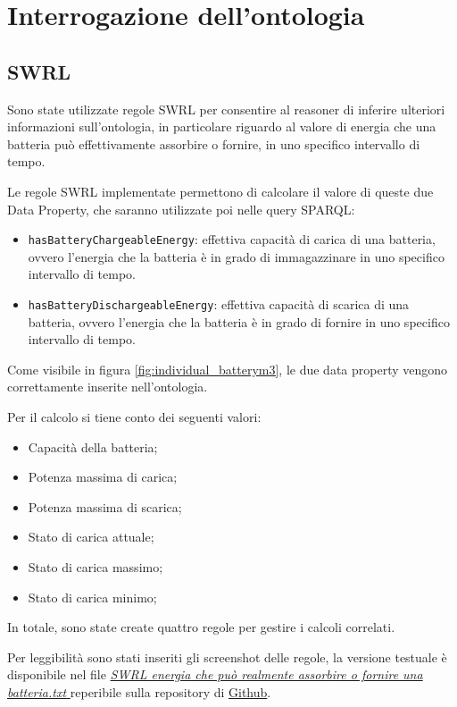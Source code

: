 \chapter{Interrogazione dell'ontologia}

\section{SWRL}
Sono state utilizzate regole SWRL per consentire al reasoner di inferire ulteriori informazioni sull'ontologia, in particolare riguardo al valore di energia che una batteria può effettivamente assorbire o fornire, in uno specifico intervallo di tempo.

Le regole SWRL implementate permettono di calcolare il valore di queste due Data Property, che saranno utilizzate poi nelle query SPARQL:
\begin{itemize}
    \item \texttt{hasBatteryChargeableEnergy}: effettiva capacità di carica di una batteria, ovvero l'energia che la batteria è in grado di immagazzinare in uno specifico intervallo di tempo.
    \item \texttt{hasBatteryDischargeableEnergy}: effettiva capacità di scarica di una batteria, ovvero l'energia che la batteria è in grado di fornire in uno specifico intervallo di tempo.
\end{itemize}

Come visibile in figura \ref{fig:individual_batterym3}, le due data property vengono correttamente inserite nell'ontologia.

Per il calcolo si tiene conto dei seguenti valori:
\begin{itemize}
    \item Capacità della batteria;
    \item Potenza massima di carica;
    \item Potenza massima di scarica;
    \item Stato di carica attuale;
    \item Stato di carica massimo;
    \item Stato di carica minimo;
\end{itemize}


In totale, sono state create quattro regole per gestire i calcoli correlati.


Per leggibilità sono stati inseriti gli screenshot delle regole, la versione testuale è disponibile nel file \href{https://github.com/19eddie/SemanticWeb-Assignment02-03/blob/main/SWRL%20energia%20che%20pu%C3%B2%20realmente%20assorbire%20o%20fornire%20una%20batteria.txt}{\textit{SWRL energia che può realmente assorbire o fornire una batteria.txt}
} reperibile sulla repository di \href{https://github.com/19eddie/SemanticWeb-Assignment02-03}{Github}. \\

